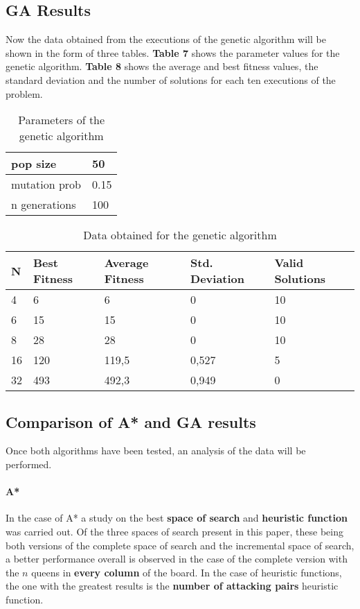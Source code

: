 \documentclass[11pt]{llncs}
\begin{document}
\subsection{GA Results}\label{gen_results}
Now the data obtained from the executions of the genetic algorithm will be shown in the form of three tables. \textbf{Table 7} shows the parameter values for the genetic algorithm. \textbf{Table 8} shows the average and best fitness values, the standard deviation and the number of solutions for each ten executions of the problem.

\begin{table}[]
\centering
\begin{tabular}{l|l}
pop size      & 50   \\ \hline
mutation prob & 0.15 \\ \hline
n generations & 100 
\end{tabular}
\caption{Parameters of the genetic algorithm}
\label{tab:ag-parameters}
\end{table}

\begin{table}[]
\centering
\begin{tabular}{lllll}
N  & Best Fitness & Average Fitness & Std. Deviation & Valid Solutions      \\ \hline
4  & 6            & 6               & 0              & 10                   \\
6  & 15           & 15              & 0              & 10                   \\
8  & 28           & 28              & 0              & 10                   \\
16 & 120          & 119,5           & 0,527          & 5                    \\
32 & 493          & 492,3           & 0,949          & 0
\end{tabular}
\caption{Data obtained for the genetic algorithm}
\label{tab:ag-data}
\end{table}
\subsection{Comparison of A* and GA results}\label{comparison_astar_gen}
Once both algorithms have been tested, an analysis of the data will be performed.

\paragraph{A*} 
In the case of A* a study on the best \textbf{space of search} and \textbf{heuristic function} was carried out. Of the three spaces of search present in this paper, these being both versions of the complete space of search and the incremental space of search, a better performance overall is observed in the case of the complete version with the $n$ queens in \textbf{every column} of the board. In the case of heuristic functions, the one with the greatest results is the \textbf{number of attacking pairs} heuristic function.
\end{document}
